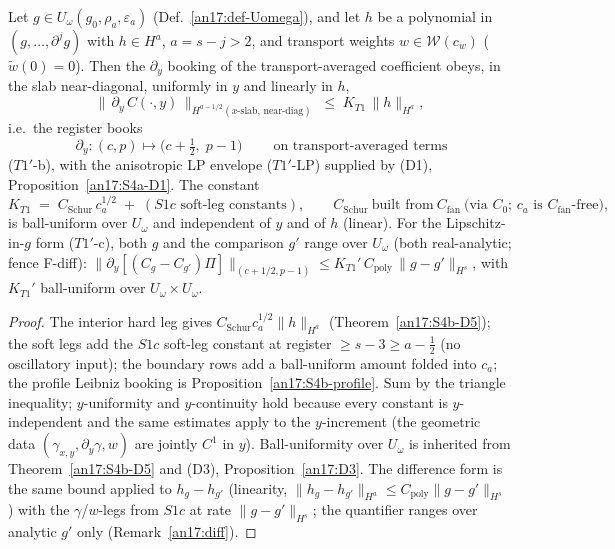 \begin{theorem}\label{an17:T1prime}\label{thm:an-T1prime}%
Let $g\in U_\omega(g_0,\rho_a,\varepsilon_a)$
\textup{(Def.~\ref{an17:def-Uomega})}, and let $h$ be a polynomial in
$(g,\dots,\partial^jg)$ with $h\in H^a$, $a=s-j>2$, and transport weights
$w\in\mathcal W(c_w)$ \textup{(}$\tilde w(0)=0$\textup{)}. Then the $\partial_y$
booking of the transport-averaged coefficient obeys, in the slab near-diagonal,
uniformly in $y$ and linearly in $h$,
\begin{equation}\label{an17:eq-T1main}
 \bigl\|\,\partial_y\,C(\cdot,y)\,\bigr\|_{H^{a-1/2}(x\text{-slab, near-diag})}
 \;\le\;K_{T1}\,\|h\|_{H^a},
\end{equation}
i.e.\ the register books
\begin{equation}\label{an17:eq-booking}
 \boxed{\ \partial_y:(c,p)\longmapsto\bigl(c+\tfrac12,\;p-1\bigr)\ }
 \qquad\text{on transport-averaged terms}
\end{equation}
\textup{(}$T1'$-b\textup{)}, with the anisotropic LP envelope
\textup{(}$T1'$-LP\textup{)} supplied by (D1),
Proposition~\ref{an17:S4a-D1}. The constant
\begin{equation}\label{an17:eq-KT1}
 K_{T1}\;=\;C_{\mathrm{Schur}}\,c_a^{1/2}\;+\;(\text{$S1c$ soft-leg constants}),
 \qquad C_{\mathrm{Schur}}\ \text{built from}\ C_{\mathrm{fan}}\
 \text{(via $C_0$; $c_a$ is $C_{\mathrm{fan}}$-free)},
\end{equation}
is ball-uniform over $U_\omega$ and independent of $y$ and of $h$ \textup{(}linear\textup{)}.
For the Lipschitz-in-$g$ form \textup{(}$T1'$-c\textup{)}, both $g$ and the
comparison $g'$ range over $U_\omega$ \textup{(}both real-analytic; fence
\textup{F-diff}\textup{)}:
$\|\partial_y[(C_g-C_{g'})\Pi]\|_{(c+1/2,p-1)}\le K_{T1}'\,C_{\mathrm{poly}}\,
\|g-g'\|_{H^s}$, with $K_{T1}'$ ball-uniform over $U_\omega\times U_\omega$.
\end{theorem}
\begin{proof}
The interior hard leg gives $C_{\mathrm{Schur}}c_a^{1/2}\|h\|_{H^a}$
(Theorem~\ref{an17:S4b-D5}); the soft legs add the $S1c$ soft-leg constant at
register $\ge s-3\ge a-\tfrac12$ (no oscillatory input); the boundary rows add a
ball-uniform amount folded into $c_a$; the profile Leibniz booking is
Proposition~\ref{an17:S4b-profile}. Sum by the triangle inequality;
$y$-uniformity and $y$-continuity hold because every constant is $y$-independent
and the same estimates apply to the $y$-increment (the geometric data
$(\gamma_{x,y},\partial_y\gamma,w)$ are jointly $C^1$ in $y$). Ball-uniformity
over $U_\omega$ is inherited from Theorem~\ref{an17:S4b-D5} and (D3),
Proposition~\ref{an17:D3}. The difference form is the same bound applied to
$h_g-h_{g'}$ (linearity, $\|h_g-h_{g'}\|_{H^a}\le C_{\mathrm{poly}}
\|g-g'\|_{H^s}$) with the $\gamma$/$w$-legs from $S1c$ at rate
$\|g-g'\|_{H^s}$; the quantifier ranges over analytic $g'$ only
(Remark~\ref{an17:diff}).
\end{proof}

